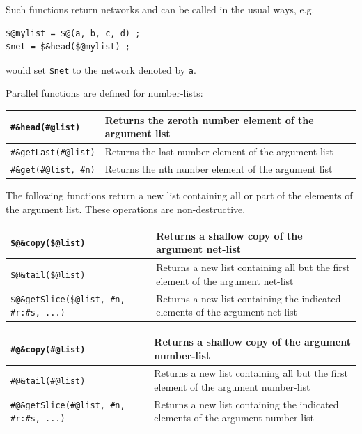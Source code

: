 \documentclass[letterpaper,12pt]{article}
\begin{document}
\vspace{.5cm}

\noindent
Such functions return networks and can be called in the usual ways, 
e.g.

\begin{Verbatim}[fontsize=\small]
$@mylist = $@(a, b, c, d) ;
$net = $&head($@mylist) ;
\end{Verbatim}

\noindent
would set \verb!$net! to the network denoted by \texttt{a}.

Parallel functions are defined for number-lists:

\vspace{.5cm}

\noindent
\begin{tabular}{|l|l|}
\hline
\verb!#&head(#@list)! & Returns the zeroth number element of the argument list\\
\hline
\verb!#&getLast(#@list)! & Returns the last number element of the argument list\\
\hline
\verb!#&get(#@list, #n)! & Returns the nth number element of the argument list\\
\hline
\end{tabular}

\vspace{.5cm}

The following functions return a new list containing all or part of the
elements of the argument list.  These operations are non-destructive.

\vspace{.5cm}

\noindent
\begin{tabular}{|l|p{4.5cm}|}
\hline
\verb!$@&copy($@list)! & Returns a shallow copy of the argument net-list\\
\hline
\verb!$@&tail($@list)! & Returns a new list containing all but the first element of the
argument net-list\\
\hline
\verb!$@&getSlice($@list, #n, #r:#s, ...)! & Returns a new list containing the
indicated elements of the argument net-list\\
\hline
\end{tabular}

\vspace{.5cm}

\noindent
\begin{tabular}{|l|p{4.5cm}|}
\hline
\verb!#@&copy(#@list)! & Returns a shallow copy of the argument number-list\\
\hline
\verb!#@&tail(#@list)! & Returns a new list containing all but the first element of the
argument number-list\\
\hline
\verb!#@&getSlice(#@list, #n, #r:#s, ...)! & Returns a new list containing the
indicated elements of the argument number-list\\
\hline
\end{tabular}
\end{document}
